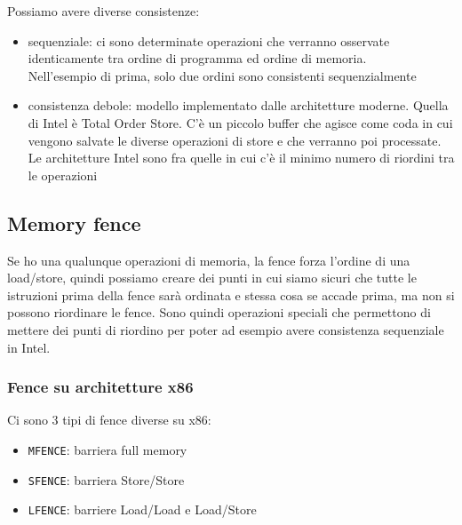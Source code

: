 \documentclass[12pt, oneside]{extbook} %
\begin{document}
Possiamo avere diverse consistenze:
\begin{itemize}
\item sequenziale: ci sono determinate operazioni che verranno osservate identicamente tra ordine di programma ed ordine di memoria.\\ Nell'esempio di prima, solo due ordini sono consistenti sequenzialmente
\item consistenza debole: modello implementato dalle architetture moderne. Quella di Intel è Total Order Store. C'è un piccolo buffer che agisce come coda in cui vengono salvate le diverse operazioni di store e che verranno poi processate. Le architetture Intel sono fra quelle in cui c'è il minimo numero di riordini tra le operazioni
\end{itemize}
\subsection{Memory fence}
Se ho una qualunque operazioni di memoria, la fence forza l'ordine di una load/store, quindi possiamo creare dei punti in cui siamo sicuri che tutte le istruzioni prima della fence sarà ordinata e stessa cosa se accade prima, ma non si possono riordinare le fence. Sono quindi operazioni speciali che permettono di mettere dei punti di riordino per poter ad esempio avere consistenza sequenziale in Intel.
\subsubsection{Fence su architetture x86}
Ci sono 3 tipi di fence diverse su x86:
\begin{itemize}
\item \texttt{MFENCE}: barriera full memory
\item \texttt{SFENCE}: barriera Store/Store
\item \texttt{LFENCE}: barriere Load/Load e Load/Store
\end{itemize}
\end{document}
